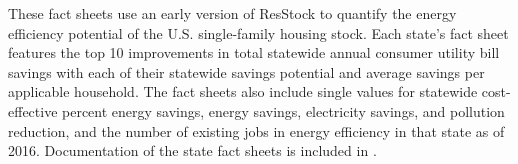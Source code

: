 These fact sheets use an early version of ResStock to quantify the energy efficiency potential of the U.S. single-family housing stock. Each state's fact sheet features the top 10 improvements in total statewide annual consumer utility bill savings with each of their statewide savings potential and average savings per applicable household. The fact sheets also include single values for statewide cost-effective percent energy savings, energy savings, electricity savings, and pollution reduction, and the number of existing jobs in energy efficiency in that state as of 2016. Documentation of the state fact sheets is included in \cite{Wilson2017}.
